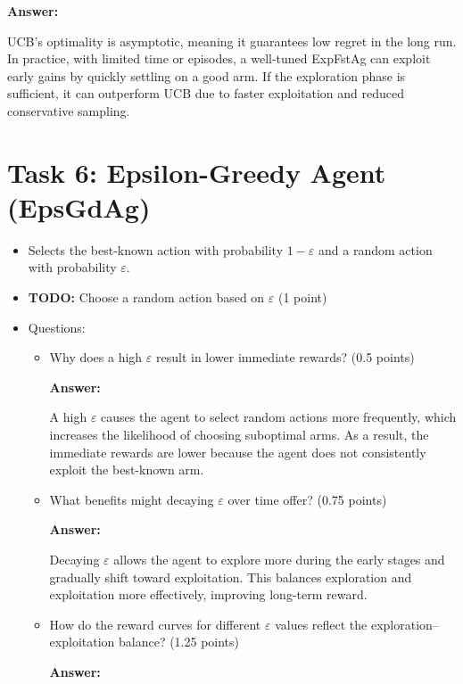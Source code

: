 \documentclass[12pt]{article}
\begin{document}
{{{\begin{itemize}
\begin{itemize}
        \textbf{Answer:}

        UCB's optimality is asymptotic, meaning it guarantees low regret in the long run. In practice, with limited time or episodes, a well-tuned ExpFstAg can exploit early gains by quickly settling on a good arm. If the exploration phase is sufficient, it can outperform UCB due to faster exploitation and reduced conservative sampling.

    \end{itemize}
\end{itemize}

\section{Task 6: Epsilon-Greedy Agent (EpsGdAg)}
\begin{itemize}[noitemsep]
    \item Selects the best-known action with probability \(1-\varepsilon\) and a random action with probability \(\varepsilon\).
    \item \textbf{TODO:} Choose a random action based on \(\varepsilon\) (1 point)
    \item Questions:
    \begin{itemize}[noitemsep]
        \item Why does a high \(\varepsilon\) result in lower immediate rewards? (0.5 points)

        \textbf{Answer:}

        A high \(\varepsilon\) causes the agent to select random actions more frequently, which increases the likelihood of choosing suboptimal arms. As a result, the immediate rewards are lower because the agent does not consistently exploit the best-known arm.

        \item What benefits might decaying \(\varepsilon\) over time offer? (0.75 points)

        \textbf{Answer:}

        Decaying \(\varepsilon\) allows the agent to explore more during the early stages and gradually shift toward exploitation. This balances exploration and exploitation more effectively, improving long-term reward.

        \item How do the reward curves for different \(\varepsilon\) values reflect the exploration–exploitation balance? (1.25 points)

        \textbf{Answer:}


\end{itemize}
\end{itemize}}}}
\end{document}
